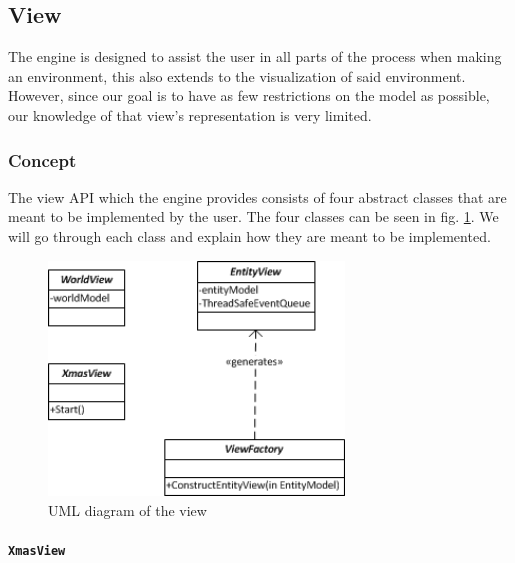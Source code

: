 
\subsection{View}

The engine is designed to assist the user in all parts of the process
when making an environment, this also extends to the visualization
of said environment. However, since our goal is to have as few restrictions
on the model as possible, our knowledge of that view\textquoteright{}s
representation is very limited.


\subsubsection{Concept}

The view API which the engine provides consists of four abstract classes
that are meant to be implemented by the user. The four classes can
be seen in fig. \ref{fig:ViewUMLView}. We will go through each class
and explain how they are meant to be implemented.

\begin{figure}
\begin{centering}
\includegraphics[width=0.7\textwidth]{ViewUmlDomainDiagram}
\par\end{centering}

\caption{UML diagram of the view\label{fig:ViewUMLView}}
\end{figure}



\paragraph*{\texttt{XmasView}}


